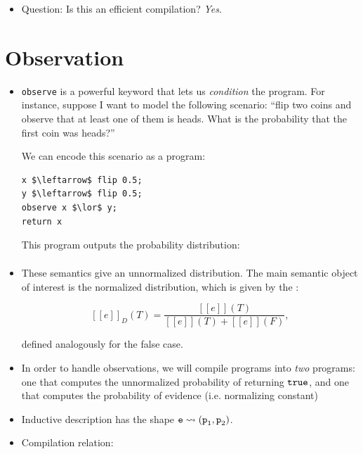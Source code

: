 \documentclass{tufte-handout}
\begin{document}
\begin{itemize}
  \item Question: Is this an efficient compilation? \emph{Yes}.
\end{itemize}

\section{Observation}
\begin{itemize}
  \item \texttt{observe} is a powerful keyword that lets us \emph{condition} the
program. For instance, suppose I want to model the following scenario: ``flip 
two coins and observe that at least one of them is heads. What is the probability 
that the first coin was heads?''

We can encode this scenario as a \disc{} program:

\begin{lstlisting}[mathescape=true]
x $\leftarrow$ flip 0.5; 
y $\leftarrow$ flip 0.5;
observe x $\lor$ y;
return x
\end{lstlisting}

This program outputs the probability distribution:
\begin{align*}
  [\true \mapsto (0.25 + 0.25) / 0.75, \false
\mapsto 0.25 / 0.75]
\end{align*} 

\item These semantics give an unnormalized distribution. The main semantic object of interest is 
the normalized distribution, which is given by the :

$$
[\![e]\!]_D(T) = \frac{[\![e]\!](T)}{[\![e]\!](T) + [\![e]\!](F) },
$$


defined analogously for the false case.
  \item In order to handle observations, we will compile \disc{} programs into 
  \emph{two} \prop{} programs: one that computes the unnormalized probability of 
  returning $\texttt{true}$, and one that computes the probability of evidence (i.e. normalizing constant)
  \item Inductive description has the shape $\texttt{e} \rightsquigarrow (\texttt{p}_1, \texttt{p}_2)$. 

  \item Compilation relation:



\end{itemize}
\end{document}
